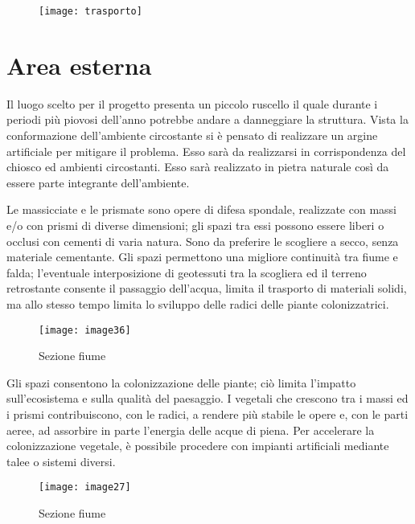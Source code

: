 \begin{figure}[H]
	\centering
	\texttt{[image: trasporto]}

\end{figure}


\newpage
\section{Area esterna}

Il luogo scelto per  il progetto presenta un piccolo ruscello il quale durante i periodi più piovosi dell'anno potrebbe andare a danneggiare la struttura. Vista la conformazione dell'ambiente circostante si è pensato di realizzare un argine artificiale per mitigare il problema. Esso sarà da realizzarsi in corrispondenza del chiosco ed ambienti circostanti. Esso sarà realizzato in pietra naturale così da essere parte integrante dell'ambiente. 

Le massicciate e le prismate sono opere di difesa spondale, realizzate con massi e/o con prismi di diverse dimensioni; gli spazi tra essi possono essere liberi o occlusi con cementi di varia natura. Sono da preferire le scogliere a secco, senza materiale cementante. Gli spazi permettono una migliore continuità tra fiume e falda; l'eventuale interposizione di geotessuti tra la scogliera ed il terreno retrostante consente il passaggio dell'acqua, limita il trasporto di materiali solidi, ma allo stesso tempo limita lo sviluppo delle radici delle piante colonizzatrici. 

\begin{figure}[H]
	\centering
	\texttt{[image: image36]}
	\caption{Sezione fiume}
	\label{fig:spnde}
\end{figure}

\noindent

Gli spazi consentono la colonizzazione delle piante; ciò limita l’impatto sull'ecosistema e sulla qualità del paesaggio. I vegetali che crescono tra i massi ed i prismi contribuiscono, con le radici, a rendere più stabile le opere e, con le parti aeree, ad assorbire in parte l’energia delle acque di piena. Per accelerare la colonizzazione vegetale, è possibile procedere con impianti artificiali mediante talee o sistemi diversi. \\

\begin{wrapfigure}[12]{r}{0.4\textwidth}
	\centering
	\texttt{[image: image27]}
	\caption{Sezione fiume}
\end{wrapfigure}

